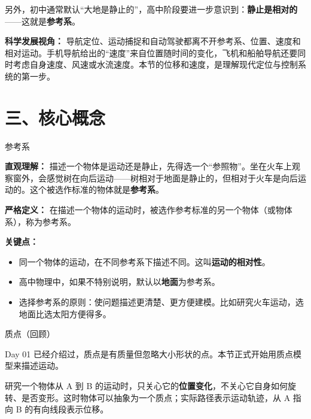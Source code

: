 另外，初中通常默认“大地是静止的”，高中阶段要进一步意识到：\textbf{静止是相对的}——这就是\textbf{参考系}。

\textbf{科学发展视角：} 导航定位、运动捕捉和自动驾驶都离不开参考系、位置、速度和相对运动。手机导航给出的“速度”来自位置随时间的变化，飞机和船舶导航还要同时考虑自身速度、风速或水流速度。本节的位移和速度，是理解现代定位与控制系统的第一步。

\section*{三、核心概念}

\begin{conceptbox}{参考系}

\textbf{直观理解：} 描述一个物体是运动还是静止，先得选一个“参照物”。坐在火车上观察窗外，会感觉树在向后运动——树相对于地面是静止的，但相对于火车是向后运动的。这个被选作标准的物体就是\textbf{参考系}。

\textbf{严格定义：} 在描述一个物体的运动时，被选作参考标准的另一个物体（或物体系），称为参考系。

\textbf{关键点：}
\begin{itemize}
  \item 同一个物体的运动，在不同参考系下描述不同。这叫\textbf{运动的相对性}。
  \item 高中物理中，如果不特别说明，默认以\textbf{地面}为参考系。
  \item 选择参考系的原则：使问题描述更清楚、更方便建模。比如研究火车运动，选地面比选太阳方便得多。
\end{itemize}

\end{conceptbox}

\begin{conceptbox}{质点（回顾）}

Day 01 已经介绍过，质点是有质量但忽略大小形状的点。本节正式开始用质点模型来描述运动。

研究一个物体从 A 到 B 的运动时，只关心它的\textbf{位置变化}，不关心它自身如何旋转、是否变形。这时物体可以抽象为一个质点；实际路径表示运动轨迹，从 A 指向 B 的有向线段表示位移。

\pagebreak
\begin{center}


\label{fig:displacement-path}
\end{center}

\end{conceptbox}

